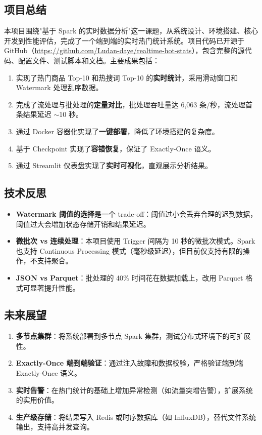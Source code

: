 \documentclass[12pt,a4paper]{article}
\begin{document}
\subsection{项目总结}

本项目围绕"基于 Spark 的实时数据分析"这一课题，从系统设计、环境搭建、核心开发到性能评估，完成了一个端到端的实时热门统计系统。项目代码已开源于 GitHub（\url{https://github.com/Ludan-daye/realtime-hot-stats}），包含完整的源代码、配置文件、测试脚本和文档。主要成果包括：

\begin{enumerate}    \item 实现了热门商品 Top-10 和热搜词 Top-10 的\textbf{实时统计}，采用滑动窗口和 Watermark 处理乱序数据。
    \item 完成了流处理与批处理的\textbf{定量对比}，批处理吞吐量达 6,063 条/秒，流处理首条结果延迟 $\sim$10 秒。
    \item 通过 Docker 容器化实现了\textbf{一键部署}，降低了环境搭建的复杂度。
    \item 基于 Checkpoint 实现了\textbf{容错恢复}，保证了 Exactly-Once 语义。
    \item 通过 Streamlit 仪表盘实现了\textbf{实时可视化}，直观展示分析结果。
\end{enumerate}

\subsection{技术反思}

\begin{itemize}    \item \textbf{Watermark 阈值的选择}是一个 trade-off：阈值过小会丢弃合理的迟到数据，阈值过大会增加状态存储开销和结果延迟。
    \item \textbf{微批次 vs 连续处理}：本项目使用 Trigger 间隔为 10 秒的微批次模式。Spark 也支持 Continuous Processing 模式（毫秒级延迟），但目前仅支持有限的操作，不支持聚合。
    \item \textbf{JSON vs Parquet}：批处理的 40\% 时间花在数据加载上，改用 Parquet 格式可显著提升性能。
\end{itemize}

\subsection{未来展望}

\begin{enumerate}    \item \textbf{多节点集群}：将系统部署到多节点 Spark 集群，测试分布式环境下的可扩展性。
    \item \textbf{Exactly-Once 端到端验证}：通过注入故障和数据校验，严格验证端到端 Exactly-Once 语义。
    \item \textbf{实时告警}：在热门统计的基础上增加异常检测（如流量突增告警），扩展系统的实用价值。
    \item \textbf{生产级存储}：将结果写入 Redis 或时序数据库（如 InfluxDB），替代文件系统输出，支持高并发查询。
\end{enumerate}
\end{document}
